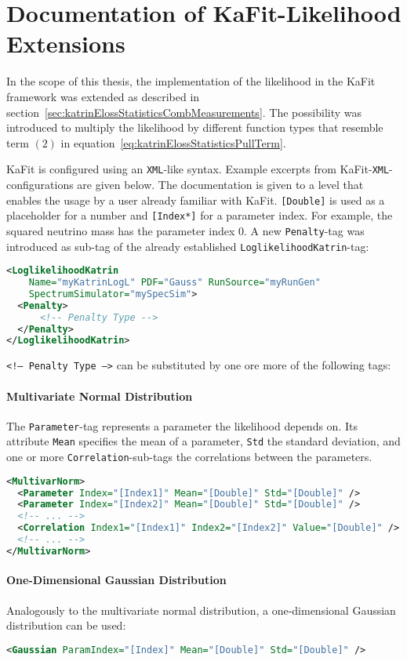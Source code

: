 \section{Documentation of KaFit-Likelihood Extensions}
\label{sec:appendixKatrinElossStatisticsLikelihoodExtKaFitConfig}
In the scope of this thesis, the implementation of the likelihood in the KaFit framework was extended as described in section~\ref{sec:katrinElossStatisticsCombMeasurements}. The possibility was introduced to multiply the likelihood by different function types that resemble term $(2)$ in equation~\eqref{eq:katrinElossStatisticsPullTerm}. 

KaFit is configured using an \texttt{XML}-like syntax. Example excerpts from KaFit-\texttt{XML}-configurations are given below. The documentation is given to a level that enables the usage by a user already familiar with KaFit. {\color{brown}\texttt{[Double]}} is used as a placeholder for a number and {\color{brown}\texttt{[Index*]}} for a parameter index. For example, the squared neutrino mass has the parameter index 0. A new \texttt{Penalty}-tag was introduced as sub-tag of the already established \texttt{LoglikelihoodKatrin}-tag:
\begin{lstlisting}[language=XML]
<LoglikelihoodKatrin 
    Name="myKatrinLogL" PDF="Gauss" RunSource="myRunGen" 
    SpectrumSimulator="mySpecSim">
  <Penalty>
      <!-- Penalty Type -->
  </Penalty>
</LoglikelihoodKatrin>
\end{lstlisting}
{\color{gray}\texttt{<!-- Penalty Type -->}} can be substituted by one ore more of the following tags:
\paragraph{Multivariate Normal Distribution}
The {\color{violet}\texttt{Parameter}}-tag represents a parameter the likelihood depends on. Its attribute {\color{magenta}\texttt{Mean}} specifies the mean of a parameter, {\color{magenta}\texttt{Std}} the standard deviation, and one or more {\color{violet}\texttt{Correlation}}-sub-tags the correlations between the parameters.
\begin{lstlisting}[language=XML]
<MultivarNorm>
  <Parameter Index="[Index1]" Mean="[Double]" Std="[Double]" />
  <Parameter Index="[Index2]" Mean="[Double]" Std="[Double]" />
  <!-- ... -->
  <Correlation Index1="[Index1]" Index2="[Index2]" Value="[Double]" />
  <!-- ... -->
</MultivarNorm>
\end{lstlisting}

\paragraph{One-Dimensional Gaussian Distribution}
Analogously to the multivariate normal distribution, a one-dimensional Gaussian distribution can be used:
\begin{lstlisting}[language=XML]
<Gaussian ParamIndex="[Index]" Mean="[Double]" Std="[Double]" />
\end{lstlisting}

